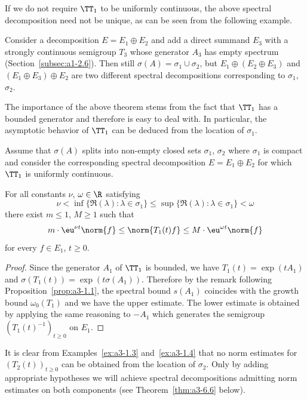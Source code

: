 \begin{example*}
If we do not require $\TT_{1}$ to be uniformly continuous, the above spectral decomposition need not be unique, as can be seen from the following example. 

Consider a decomposition $E = E_{1} \oplus E_{2}$ and add a direct summand $E_{3}$ with a strongly continuous semigroup $T_{3}$ whose generator $A_{3}$ has empty spectrum (\eg Section~\ref{subsec:a1-2.6}).
Then still $\sigma(A) = \sigma_{1} \cup \sigma_{2}$, but $E_{1} \oplus (E_{2} \oplus E_{3})$ and $(E_{1} \oplus E_{3}) \oplus E_{2}$ are two different spectral decompositions corresponding to $\sigma_{1}$, $\sigma_{2}$.
\end{example*}
The importance of the above theorem stems from the fact that $\TT_{1}$ has a bounded generator and therefore is easy to deal with.
In particular, the asymptotic behavior of\/ $\TT_{1}$ can be deduced from the location of\/ $\sigma_{1}$.
\begin{corollary}\label{cor:a3-3.4}
Assume that $\sigma(A)$ splits into non-empty closed sets $\sigma_{1}$, $\sigma_{2}$ where $\sigma_{1}$ is compact and consider the corresponding spectral decomposition $E = E_{1} \oplus E_{2}$ for which $\TT_{1}$ is uniformly continuous.

For all constants $\nu$, $\omega \in \R$ satisfying
\[
\nu < \inf \{\Re(\lambda) \colon \lambda \in \sigma_{1}\} \leq \sup \{\Re(\lambda) \colon \lambda \in \sigma_{1}\} < \omega
\]
there exist $m \leq 1$, $M \geq 1$ such that
\[
m \cdot \eu^{\nu t}\norm{f} \leq \norm{T_{1}(t)f} \leq M \cdot \eu^{\omega t}\norm{f}
\]
for every $f \in E_{1}$, $t \geq 0$.
\end{corollary}
\begin{proof}
Since the generator $A_{1}$ of\/ $\TT_{1}$ is bounded, we have $T_{1}(t) = \exp(tA_{1})$ and $\sigma(T_{1}(t)) = \exp(t\sigma(A_{1}))$.
Therefore by the remark following Proposition~\ref{prop:a3-1.1}, the spectral bound $s(A_{1})$ coincides with the growth bound $\omega_{0}(T_{1})$ and we have the upper estimate.
The lower estimate is obtained by applying the same reasoning to $-A_{1}$ which generates the semigroup $(T_{1}(t)^{-1})_{t \geq 0}$ on $E_{1}$.
\end{proof}
It is clear from Examples~\ref{ex:a3-1.3} and~\ref{ex:a3-1.4} that no norm estimates for $(T_{2}(t))_{t \geq 0}$ can be obtained from the location of\/ $\sigma_{2}$.
Only by adding appropriate hypotheses we will achieve spectral decompositions admitting norm estimates on both components (see Theorem~\ref{thm:a3-6.6} below).

